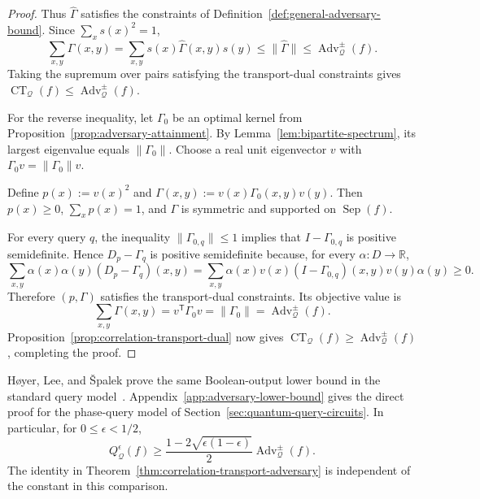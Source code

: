 \documentclass[11pt]{article}
\numberwithin{equation}{section}
\theoremstyle{remark}
\begin{document}
\begin{proof}
Thus $\widehat\Gamma$ satisfies the constraints of
Definition~\ref{def:general-adversary-bound}. Since
$\sum_xs(x)^2=1$,
\begin{equation}
    \sum_{x,y}\Gamma(x,y)
    =
    \sum_{x,y}s(x)\widehat\Gamma(x,y)s(y)
    \leq
    \|\widehat\Gamma\|
    \leq
    \operatorname{Adv}^{\pm}_{\mathcal Q}(f).
\end{equation}
Taking the supremum over pairs satisfying the transport-dual constraints gives
$\operatorname{CT}_{\mathcal Q}(f)
\leq\operatorname{Adv}^{\pm}_{\mathcal Q}(f)$.

For the reverse inequality, let $\Gamma_0$ be an optimal kernel from
Proposition~\ref{prop:adversary-attainment}. By
Lemma~\ref{lem:bipartite-spectrum}, its largest eigenvalue equals
$\|\Gamma_0\|$. Choose a real unit eigenvector $v$ with
$\Gamma_0v=\|\Gamma_0\|v$.

Define $p(x):=v(x)^2$ and
$\Gamma(x,y):=v(x)\Gamma_0(x,y)v(y)$. Then $p(x)\geq0$,
$\sum_xp(x)=1$, and $\Gamma$ is symmetric and supported on
$\operatorname{Sep}(f)$.

For every query $q$, the inequality $\|\Gamma_{0,q}\|\leq1$ implies that
$I-\Gamma_{0,q}$ is positive semidefinite. Hence $D_p-\Gamma_q$ is positive semidefinite because,
for every $\alpha:D\to\mathbb R$,
\begin{equation}
    \sum_{x,y}\alpha(x)\alpha(y)(D_p-\Gamma_q)(x,y)=\sum_{x,y}\alpha(x)v(x)(I-\Gamma_{0,q})(x,y)v(y)\alpha(y)\geq0.
\end{equation}
Therefore $(p,\Gamma)$ satisfies the transport-dual constraints. Its objective
value is
\begin{equation}
    \sum_{x,y}\Gamma(x,y)
    =
    v^{\mathsf T}\Gamma_0v
    =
    \|\Gamma_0\|
    =
    \operatorname{Adv}^{\pm}_{\mathcal Q}(f).
\end{equation}
Proposition~\ref{prop:correlation-transport-dual} now gives
$\operatorname{CT}_{\mathcal Q}(f)
\geq\operatorname{Adv}^{\pm}_{\mathcal Q}(f)$, completing the proof.
\end{proof}

H{\o}yer, Lee, and {\v S}palek prove the same Boolean-output lower bound in the standard query model~\cite[Theorem~2]{HoyerLeeSpalek2007}. Appendix~\ref{app:adversary-lower-bound} gives the direct proof for the phase-query model of Section~\ref{sec:quantum-query-circuits}. In particular, for $0\leq\epsilon<1/2$,
\begin{equation}
    Q_{\mathcal Q}^{\epsilon}(f)
    \geq
    \frac{1-2\sqrt{\epsilon(1-\epsilon)}}{2}
    \operatorname{Adv}^{\pm}_{\mathcal Q}(f).
\end{equation}
The identity in Theorem~\ref{thm:correlation-transport-adversary} is independent of the constant in this comparison.
\end{document}
